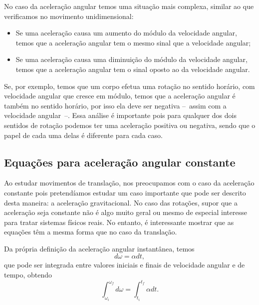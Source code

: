 No caso da aceleração angular temos uma situação mais complexa, similar ao que verificamos no movimento unidimensional:
\begin{itemize}
    \item Se uma aceleração causa um aumento do módulo da velocidade angular, temos que a aceleração angular tem o mesmo sinal que a velocidade angular;
    \item Se uma aceleração causa uma diminuição do módulo da velocidade angular, temos que a aceleração angular tem o sinal oposto ao da velocidade angular.
\end{itemize}
%
Se, por exemplo, temos que um corpo efetua uma rotação no sentido horário, com velocidade angular que cresce em módulo, temos que a aceleração angular é também no sentido horário, por isso ela deve ser negativa --~assim com a velocidade angular~--. Essa análise é importante pois para qualquer dos dois sentidos de rotação podemos ter uma aceleração positiva ou negativa, sendo que o papel de cada uma delas é diferente para cada caso.

\subsection{Equações para aceleração angular constante}

Ao estudar movimentos de translação, nos preocupamos com o caso da aceleração constante pois pretendíamos estudar um caso importante que pode ser descrito desta maneira: a aceleração gravitacional. No caso das rotações, supor que a aceleração seja constante não é algo muito geral ou mesmo de especial interesse para tratar sistemas físicos reais. No entanto, é interessante mostrar que as equações têm a mesma forma que no caso da translação.

Da própria definição da aceleração angular instantânea, temos
\begin{equation}
	d\omega = \alpha dt,
\end{equation}
%
que pode ser integrada entre valores iniciais e finais de velocidade angular e de tempo, obtendo
\begin{equation}
	\int_{\omega_i}^{\omega_f} d\omega = \int_{t_i}^{t_f} \alpha dt.
\end{equation}

